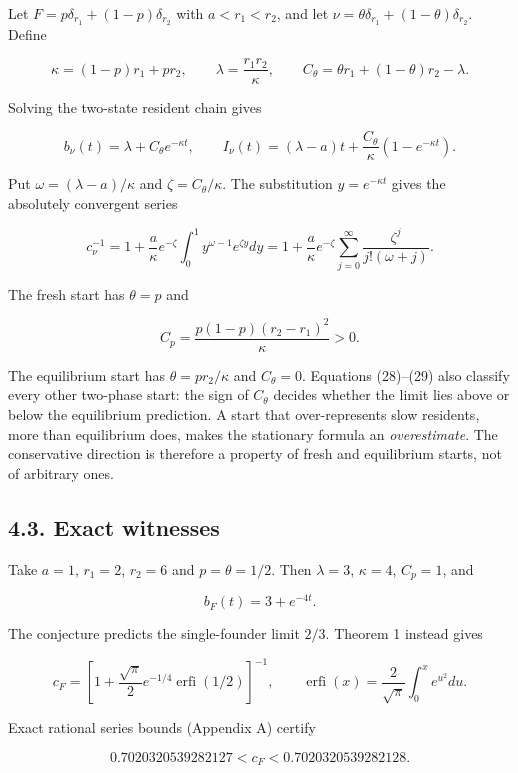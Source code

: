 \documentclass[
  british,
  11pt,
  a4paper,
]{article}
\begin{document}
Let \(F=p\delta_{r_1}+(1-p)\delta_{r_2}\) with \(a<r_1<r_2\), and let
\(\nu=\theta\delta_{r_1}+(1-\theta)\delta_{r_2}\). Define

\[
\kappa=(1-p)r_1+pr_2,\qquad \lambda=\frac{r_1r_2}{\kappa},\qquad
C_\theta=\theta r_1+(1-\theta)r_2-\lambda.
\tag{27}
\]

Solving the two-state resident chain gives

\[
b_\nu(t)=\lambda+C_\theta e^{-\kappa t},\qquad
I_\nu(t)=(\lambda-a)t+\frac{C_\theta}{\kappa}(1-e^{-\kappa t}).
\tag{28}
\]

Put \(\omega=(\lambda-a)/\kappa\) and \(\zeta=C_\theta/\kappa\). The
substitution \(y=e^{-\kappa t}\) gives the absolutely convergent series

\[
c_\nu^{-1}
=1+\frac a\kappa e^{-\zeta}\int_0^1y^{\omega-1}e^{\zeta y}dy
=1+\frac a\kappa e^{-\zeta}\sum_{j=0}^\infty\frac{\zeta^j}{j!(\omega+j)}.
\tag{29}
\]

The fresh start has \(\theta=p\) and

\[
C_p=\frac{p(1-p)(r_2-r_1)^2}{\kappa}>0.
\tag{30}
\]

The equilibrium start has \(\theta=pr_2/\kappa\) and \(C_\theta=0\).
Equations (28)--(29) also classify every other two-phase start: the sign
of \(C_\theta\) decides whether the limit lies above or below the
equilibrium prediction. A start that over-represents slow residents,
more than equilibrium does, makes the stationary formula an
\emph{overestimate}. The conservative direction is therefore a property
of fresh and equilibrium starts, not of arbitrary ones.

\subsection{4.3. Exact witnesses}\label{exact-witnesses}

Take \(a=1\), \(r_1=2\), \(r_2=6\) and \(p=\theta=1/2\). Then
\(\lambda=3\), \(\kappa=4\), \(C_p=1\), and

\[
b_F(t)=3+e^{-4t}.
\tag{31}
\]

The conjecture predicts the single-founder limit \(2/3\). Theorem 1
instead gives

\[
c_F=\left[1+\frac{\sqrt\pi}{2}e^{-1/4}\operatorname{erfi}(1/2)\right]^{-1},
\qquad\operatorname{erfi}(x)=\frac2{\sqrt\pi}\int_0^xe^{u^2}du.
\tag{32}
\]

Exact rational series bounds (Appendix A) certify

\[
0.7020320539282127<c_F<0.7020320539282128.
\tag{33}
\]
\end{document}
